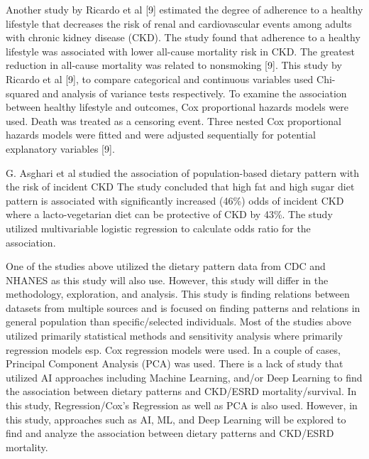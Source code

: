 Another study by Ricardo et al [9] estimated the degree of adherence to a healthy lifestyle that decreases the risk of renal and cardiovascular events among adults with chronic kidney disease (CKD). The study found that adherence to a healthy lifestyle was associated with
lower all-cause mortality risk in CKD. The greatest reduction in all-cause mortality was related to nonsmoking [9]. This study by Ricardo et al [9], to compare categorical and continuous variables used Chi-squared and analysis of variance tests respectively. To examine the
association between healthy lifestyle and outcomes, Cox proportional hazards models were used. Death was treated as a censoring event. Three nested Cox proportional hazards models were fitted and were adjusted sequentially for potential explanatory variables [9].

G. Asghari et al studied the association of population-based dietary pattern with the risk of incident CKD The study concluded that high fat and high sugar diet pattern is associated with significantly increased (46\%) odds of incident CKD where a lacto-vegetarian diet can
be protective of CKD by 43\%. The study utilized multivariable logistic regression to calculate odds ratio for the association.

One of the studies above utilized the dietary pattern data from CDC and NHANES as this study will also use. However, this study will differ in the methodology, exploration, and analysis. This study is finding relations between datasets from multiple sources and is focused
on finding patterns and relations in general population than specific/selected individuals. Most of the studies above utilized primarily statistical methods and sensitivity analysis where primarily regression models esp. Cox regression models were used. In a couple of
cases, Principal Component Analysis (PCA) was used. There is a lack of study that utilized AI approaches including Machine Learning, and/or Deep Learning to find the association between dietary patterns and CKD/ESRD mortality/survival. In this study, Regression/Cox’s
Regression as well as PCA is also used. However, in this study, approaches such as AI, ML, and Deep Learning will be explored to find and analyze the association between dietary patterns and CKD/ESRD mortality.
